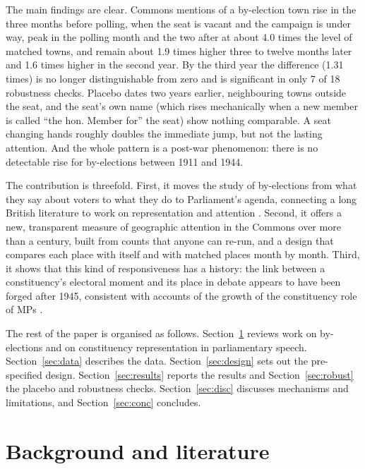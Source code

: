 \documentclass[11pt,a4paper]{article}
\begin{document}
The main findings are clear. Commons mentions of a by-election town rise in the three months before polling, when the seat is vacant and the campaign is under way, peak in the polling month and the two after at about 4.0 times the level of matched towns, and remain about 1.9 times higher three to twelve months later and 1.6 times higher in the second year. By the third year the difference (1.31 times) is no longer distinguishable from zero and is significant in only 7 of 18 robustness checks. Placebo dates two years earlier, neighbouring towns outside the seat, and the seat's own name (which rises mechanically when a new member is called ``the hon. Member for'' the seat) show nothing comparable. A seat changing hands roughly doubles the immediate jump, but not the lasting attention. And the whole pattern is a post-war phenomenon: there is no detectable rise for by-elections between 1911 and 1944.

The contribution is threefold. First, it moves the study of by-elections from what they say about voters to what they do to Parliament's agenda, connecting a long British literature to work on representation and attention \citep{eulau1977,jones2005}. Second, it offers a new, transparent measure of geographic attention in the Commons over more than a century, built from counts that anyone can re-run, and a design that compares each place with itself and with matched places month by month. Third, it shows that this kind of responsiveness has a history: the link between a constituency's electoral moment and its place in debate appears to have been forged after 1945, consistent with accounts of the growth of the constituency role of MPs \citep{norton1994,norton1993}.

The rest of the paper is organised as follows. Section~\ref{sec:lit} reviews work on by-elections and on constituency representation in parliamentary speech. Section~\ref{sec:data} describes the data. Section~\ref{sec:design} sets out the pre-specified design. Section~\ref{sec:results} reports the results and Section~\ref{sec:robust} the placebo and robustness checks. Section~\ref{sec:disc} discusses mechanisms and limitations, and Section~\ref{sec:conc} concludes.

\section{Background and literature}\label{sec:lit}
\end{document}
